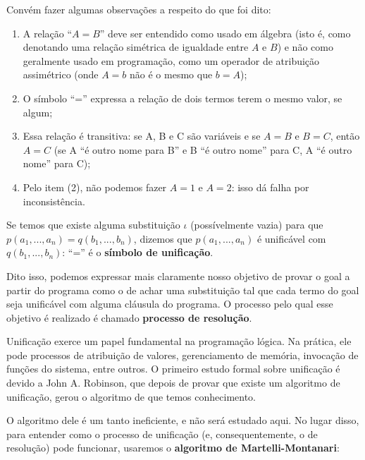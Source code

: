 \documentclass{article}
\theoremstyle{remark}
\theoremstyle{theorem}
\begin{document}
Convém fazer algumas observações a respeito do que foi dito:

\begin{enumerate}
  \item A relação ``$A = B$'' deve ser entendido como usado em álgebra (isto é, como denotando uma relação simétrica de igualdade entre $A$ e $B$) e não como geralmente usado em programação, como um operador de atribuição assimétrico (onde $A = b$ não é o mesmo que $b = A$);
  \item O símbolo ``='' expressa a relação de dois termos terem o mesmo valor, se algum;
  \item Essa relação é transitiva: se A, B e C são variáveis e se $A = B$ e $B = C$, então $A = C$ (se A ``é outro nome para B'' e B ``é outro nome'' para C, A ``é outro nome'' para C);
  \item Pelo item (2), não podemos fazer $A = 1$ e $A = 2$: isso dá falha por inconsistência.
\end{enumerate}

Se temos que existe alguma substituição $\iota$ (possívelmente vazia) para que $p(a_1, ..., a_n) = q(b_1, ..., b_n)$, dizemos que  $p(a_1, ..., a_n)$ é unificável com $q(b_1, ..., b_n)$: ``='' é o \textbf{símbolo de unificação}.

Dito isso, podemos expressar mais claramente nosso objetivo de provar o goal a partir do programa como o de achar uma substituição tal que cada termo do goal seja unificável com alguma cláusula do programa. O processo pelo qual esse objetivo é realizado é chamado \textbf{processo de resolução}.

Unificação exerce um papel fundamental na programação lógica. Na prática, ele pode processos de atribuição de valores, gerenciamento de memória, invocação de funções do sistema, entre outros. O primeiro estudo formal sobre unificação é devido a John A. Robinson, que depois de provar que existe um algoritmo de unificação, gerou o algoritmo de que temos conhecimento.

O algoritmo dele é um tanto ineficiente, e não será estudado aqui. No lugar disso, para entender como o processo de unificação (e, consequentemente, o de resolução) pode funcionar, usaremos o \textbf{algoritmo de Martelli-Montanari}:
\vspace{0.5cm}

%
%
\end{document}
